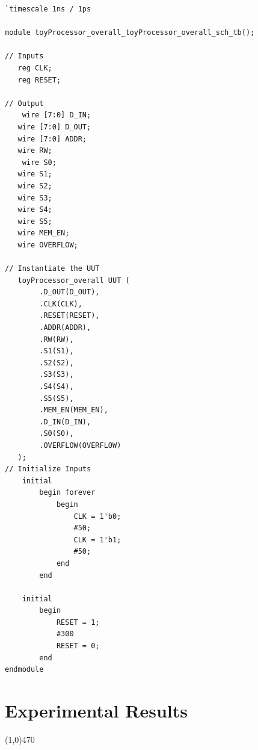 \documentclass[12pt]{article}
\begin{document}
		\begin{Verbatim}[frame=single, fontsize= \small]
`timescale 1ns / 1ps

module toyProcessor_overall_toyProcessor_overall_sch_tb();

// Inputs
   reg CLK;
   reg RESET;

// Output
	wire [7:0] D_IN;
   wire [7:0] D_OUT;
   wire [7:0] ADDR;
   wire RW;
	wire S0;
   wire S1;
   wire S2;
   wire S3;
   wire S4;
   wire S5;
   wire MEM_EN;
   wire OVERFLOW;

// Instantiate the UUT
   toyProcessor_overall UUT (
		.D_OUT(D_OUT), 
		.CLK(CLK), 
		.RESET(RESET), 
		.ADDR(ADDR), 
		.RW(RW), 
		.S1(S1), 
		.S2(S2), 
		.S3(S3), 
		.S4(S4), 
		.S5(S5), 
		.MEM_EN(MEM_EN), 
		.D_IN(D_IN), 
		.S0(S0), 
		.OVERFLOW(OVERFLOW)
   );
// Initialize Inputs
	initial
		begin forever
			begin
				CLK = 1'b0;
				#50;
				CLK = 1'b1;
				#50;
			end
		end
		
	initial
		begin
			RESET = 1;
			#300
			RESET = 0;
		end
endmodule
		\end{Verbatim}


\newpage			
\section{Experimental Results}\vspace{-.7cm} \line(1,0){470}
\end{document}
